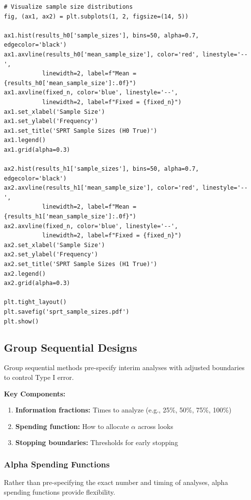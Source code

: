 \begin{lstlisting}
# Visualize sample size distributions
fig, (ax1, ax2) = plt.subplots(1, 2, figsize=(14, 5))

ax1.hist(results_h0['sample_sizes'], bins=50, alpha=0.7, edgecolor='black')
ax1.axvline(results_h0['mean_sample_size'], color='red', linestyle='--',
           linewidth=2, label=f"Mean = {results_h0['mean_sample_size']:.0f}")
ax1.axvline(fixed_n, color='blue', linestyle='--',
           linewidth=2, label=f"Fixed = {fixed_n}")
ax1.set_xlabel('Sample Size')
ax1.set_ylabel('Frequency')
ax1.set_title('SPRT Sample Sizes (H0 True)')
ax1.legend()
ax1.grid(alpha=0.3)

ax2.hist(results_h1['sample_sizes'], bins=50, alpha=0.7, edgecolor='black')
ax2.axvline(results_h1['mean_sample_size'], color='red', linestyle='--',
           linewidth=2, label=f"Mean = {results_h1['mean_sample_size']:.0f}")
ax2.axvline(fixed_n, color='blue', linestyle='--',
           linewidth=2, label=f"Fixed = {fixed_n}")
ax2.set_xlabel('Sample Size')
ax2.set_ylabel('Frequency')
ax2.set_title('SPRT Sample Sizes (H1 True)')
ax2.legend()
ax2.grid(alpha=0.3)

plt.tight_layout()
plt.savefig('sprt_sample_sizes.pdf')
plt.show()
\end{lstlisting}

\subsection{Group Sequential Designs}

Group sequential methods pre-specify interim analyses with adjusted boundaries to control Type I error.

\textbf{Key Components:}
\begin{enumerate}
    \item \textbf{Information fractions:} Times to analyze (e.g., 25\%, 50\%, 75\%, 100\%)
    \item \textbf{Spending function:} How to allocate $\alpha$ across looks
    \item \textbf{Stopping boundaries:} Thresholds for early stopping
\end{enumerate}

\subsubsection{Alpha Spending Functions}

Rather than pre-specifying the exact number and timing of analyses, alpha spending functions provide flexibility.

